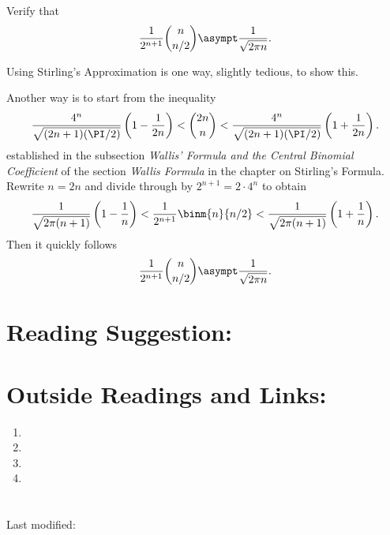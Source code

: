\documentclass[12pt]{article}
\begin{document}
  \begin{exercise}
    Verify that
    \[
    \frac{1}{2^{n+1}}\binom{n}{n/2} \asympt \frac{1}{\sqrt{2 \pi n}}.
\]
\end{exercise}
\begin{solution}
  Using Stirling's Approximation is one way, slightly tedious,  to
  show this.

  Another way is to start from the inequality
  \[
    \frac{4^n}{\sqrt{(2n+1)(\PI/2)}}\left(1-\frac{1}{2n} \right) < {\binom
    {2n}{n}} < \frac{4^n}{\sqrt{(2n+1)(\PI/2)}} \left(1 + \frac{1}{2n}
    \right).
\]
 established in the subsection \emph{Wallis' Formula and the Central
 Binomial Coefficient} of the section \emph{Wallis Formula} in the
chapter on Stirling's Formula.  Rewrite \( n = 2n \) and divide
through by \( 2^{n + 1} = 2 \cdot 4^n \) to obtain
\[
  \frac{1}{\sqrt{2\pi(n+1)}} \left( 1 - \frac{1}{n} \right) <
  \frac{1}{2^{n+1}} \binm{n}{n/2} <
  \frac{1}{\sqrt{2\pi(n+1)}} \left( 1 + \frac{1}{n} \right).
\]
Then it quickly follows 
    \[
    \frac{1}{2^{n+1}}\binom{n}{n/2} \asympt \frac{1}{\sqrt{2 \pi n}}.
\]
\end{solution}

\hr

\section*{Reading Suggestion:}




\hr

\section*{Outside Readings and Links:}
\begin{enumerate}
    \item
    \item
    \item
    \item
\end{enumerate}

\section*{\solutionsname} \loadSolutions

\hr

\mydisclaim \myfooter

Last modified:  \flastmod
\end{document}
